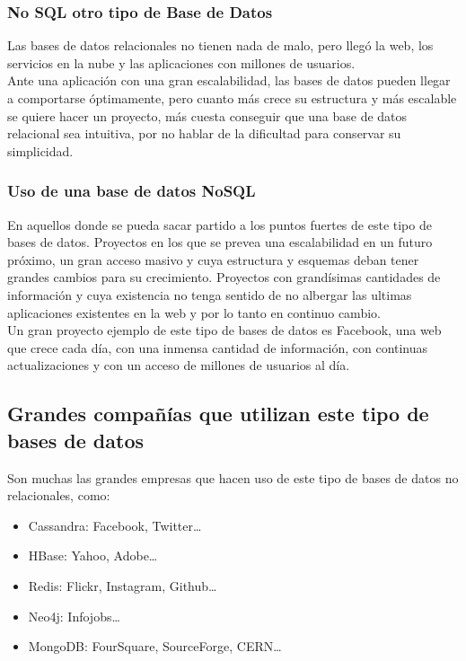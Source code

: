 \documentclass[preprint,12pt]{elsarticle}
\begin{document}

\subsubsection{\textbf{No SQL otro tipo de Base de Datos}}

Las bases de datos relacionales no tienen nada de malo, pero llegó la web, los servicios en la nube y las aplicaciones con millones de usuarios.
\\
Ante una aplicación con una gran escalabilidad,  las bases de datos pueden llegar a comportarse óptimamente, pero cuanto más crece su estructura y más escalable se quiere hacer un proyecto, más cuesta conseguir que una base de datos relacional sea intuitiva, por no hablar de la dificultad para conservar su simplicidad.

\subsubsection{\textbf{Uso de una base de datos NoSQL}}

En aquellos donde se pueda sacar partido a los puntos fuertes de este tipo de bases de datos. Proyectos en los que se prevea una escalabilidad en un futuro próximo, un gran acceso masivo y cuya estructura y esquemas deban tener grandes cambios para su crecimiento. Proyectos con grandísimas cantidades de información y cuya existencia no tenga sentido de no albergar las ultimas aplicaciones existentes en la web y por lo tanto en continuo cambio.
\\
Un gran proyecto ejemplo de este tipo de bases de datos es Facebook, una web que crece cada día, con una inmensa cantidad de información, con continuas actualizaciones y con un acceso de millones de usuarios al día.



\subsection{\textbf{Grandes compañías que utilizan este tipo de bases de datos}}
Son muchas las grandes empresas que hacen uso de este tipo de bases de datos no relacionales, como:
\begin{itemize}
\item Cassandra: Facebook, Twitter…
\item HBase: Yahoo, Adobe…
\item Redis: Flickr, Instagram, Github…
\item Neo4j: Infojobs…
\item MongoDB: FourSquare, SourceForge, CERN… 
\end{itemize}
\end{document}
